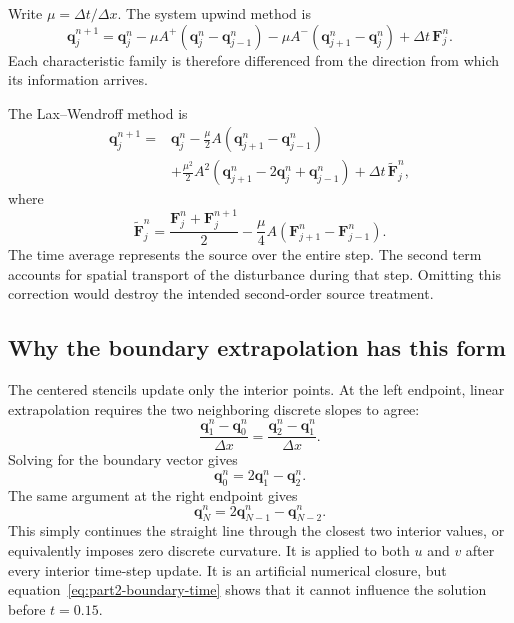 Write $\mu=\Delta t/\Delta x$. The system upwind method is
\begin{equation}
 \boxed{
 \mathbf q_j^{n+1}=\mathbf q_j^n
 -\mu A^+(\mathbf q_j^n-\mathbf q_{j-1}^n)
 -\mu A^-(\mathbf q_{j+1}^n-\mathbf q_j^n)
 +\Delta t\,\mathbf F_j^n.}
 \label{eq:part2-upwind}
\end{equation}
Each characteristic family is therefore differenced from the direction from
which its information arrives.

The Lax--Wendroff method is
\begin{align}
 \mathbf q_j^{n+1}
 ={}&\mathbf q_j^n
 -\frac{\mu}{2}A(\mathbf q_{j+1}^n-\mathbf q_{j-1}^n)\nonumber\\
 &+\frac{\mu^2}{2}A^2
 (\mathbf q_{j+1}^n-2\mathbf q_j^n+\mathbf q_{j-1}^n)
 +\Delta t\,\widetilde{\mathbf F}_j^n,
 \label{eq:part2-lw}
\end{align}
where
\begin{equation}
 \widetilde{\mathbf F}_j^n
 =\frac{\mathbf F_j^n+\mathbf F_j^{n+1}}{2}
 -\frac{\mu}{4}A(\mathbf F_{j+1}^n-\mathbf F_{j-1}^n).
 \label{eq:part2-source-correction}
\end{equation}
The time average represents the source over the entire step. The second term
accounts for spatial transport of the disturbance during that step. Omitting
this correction would destroy the intended second-order source treatment.

\subsection{Why the boundary extrapolation has this form}

The centered stencils update only the interior points. At the left endpoint,
linear extrapolation requires the two neighboring discrete slopes to agree:
\begin{equation}
 \frac{\mathbf q_1^n-\mathbf q_0^n}{\Delta x}
 =\frac{\mathbf q_2^n-\mathbf q_1^n}{\Delta x}.
\end{equation}
Solving for the boundary vector gives
\begin{equation}
 \boxed{\mathbf q_0^n=2\mathbf q_1^n-\mathbf q_2^n.}
\end{equation}
The same argument at the right endpoint gives
\begin{equation}
 \boxed{\mathbf q_N^n=2\mathbf q_{N-1}^n-\mathbf q_{N-2}^n.}
\end{equation}
This simply continues the straight line through the closest two interior
values, or equivalently imposes zero discrete curvature. It is applied to
both $u$ and $v$ after every interior time-step update. It is an artificial
numerical closure, but equation~\eqref{eq:part2-boundary-time} shows that it
cannot influence the solution before $t=0.15$.

